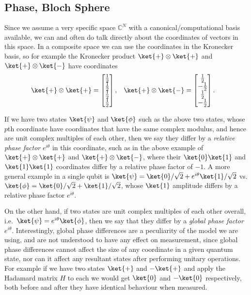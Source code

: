 \subsection{Phase, Bloch Sphere}
Since we assume a very specific space $\mathbb{C}^N$ with a canonical/computational basis available, we can and often do talk directly about the coordinates of vectors in this space. In a composite space we can use the coordinates in the Kronecker basis, so for example the Kronecker product $\ket{+}\otimes \ket{+}$ and $\ket{+} \otimes \ket{-}$ have coordinates
\begin{align*}
\ket{+} \otimes \ket{+} = \left[\begin{matrix}
\frac{1}{2} \\
\frac{1}{2} \\
\frac{1}{2} \\
\frac{1}{2} \\
\end{matrix}\right],
&&&
\ket{+} \otimes \ket{-} = \left[\begin{matrix}
	\frac{1}{2} \\
	-\frac{1}{2} \\
	\frac{1}{2} \\
	-\frac{1}{2} \\
\end{matrix}\right].\end{align*}

If we have two states $\ket{\psi}$ and $\ket{\phi}$ such as the above two states, whose $p$th coordinate have coordinates that have the same complex modulus, and hence are unit complex multiples of each other, then we say they differ by a \emph{relative phase factor} $e^{i\theta}$ in this coordinate, such as in the above example of $\ket{+}\otimes \ket{+}$ and $\ket{+}\otimes \ket{-}$, where their $\ket{0}\ket{1}$ and $\ket{1}\ket{1}$ coordinates differ by a relative phase factor of $-1$. A more general example in a single qubit is $\ket{\psi} = \ket{0}/\sqrt{2} + e^{i\theta}\ket{1}/\sqrt{2}$ vs. $\ket{\phi} = \ket{0}/\sqrt{2} + \ket{1}/\sqrt{2}$, whose $\ket{1}$ amplitude differs by a relative phase factor $e^{i\theta}$.

On the other hand, if two states are unit complex multiples of each other overall, i.e.\ $\ket{\psi} = e^{i\theta}\ket{\phi}$, then we say that they differ by a \emph{global phase factor} $e^{i\theta}$. Interestingly, global phase differences are a peculiarity of the model we are using, and are not understood to have any effect on measurement, since global phase differences cannot affect the size of any coordinate in a given quantum state, nor can it affect any resultant states after performing unitary operations. For example if we have two states $\ket{+}$ and $-\ket{+}$ and apply the Hadamard matrix $H$ to each we would get $\ket{0}$ and $-\ket{0}$ respectively, both before and after they have identical behaviour when measured.

